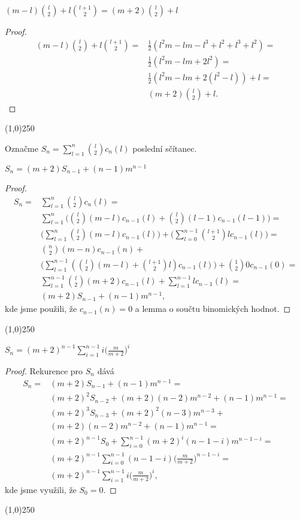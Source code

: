 \documentclass[a4paper,12pt]{article}
\newenvironment{myproof}{
  \begin{proof}
    
  }{
  \end{proof}
  \begin{center}
   \line(1,0){250}
   \end{center}
  }
\begin{document}
\begin{lemma}
    $(m-l)\binom l2+l\binom {l+1}2 = (m+2)\binom l2+l$
\end{lemma}
\begin{myproof}
    \begin{align*}(m-l)\binom l2+l\binom {l+1}2=&\frac 12(l^2m-lm-l^3+l^2+l^
    3+l^2)=\\
    &\frac 12(l^2m-lm+2l^2)=\\
    &\frac 12(l^2m-lm+2(l^2-l))+l=\\
    &(m+2)\binom l2+l.\end{align*}
\end{myproof}

Označme $S_n=\sum_{l=1}^n\binom l2c_n(l)$ poslední sčítanec.

\begin{lemma}
    $S_n = (m+2)S_{n-1}+(n-1)m^{n-1}$
\end{lemma}

\begin{myproof}
\begin{align*} S_n=&\sum_{l=1}^n\binom l2c_n(l)=\\
&\sum_{l=1}^n\big(\binom l2(m-l)c_{n-1}(l)+\binom l2(l-1)c_{n-1}(
l-1)\big)=\\
&\big(\sum_{l=1}^n\binom l2(m-l)c_{n-1}(l)\big)+\big(\sum_{l=0}^{
n-1}\binom {l+1}2lc_{n-1}(l)\big)=\\
&\binom n2(m-n)c_{n-1}(n)+\\
&\big(\sum_{l=1}^{n-1}(\binom l2(m-l)+\binom {l+1}2l)c_{n-1}(l)\big
)+\binom 120c_{n-1}(0)=\\
&\sum_{l=1}^{n-1}\binom l2(m+2)c_{n-1}(l)+\sum_{l=1}^{n-1}lc_{n-1}
(l)=\\
&(m+2)S_{n-1}+(n-1)m^{n-1},\end{align*}
kde jsme použili, že $c_{n-1}(n)=0$ a lemma o součtu binomických hodnot.
\end{myproof}

\begin{lemma}
    $S_n = (m+2)^{n-1}\sum_{i=1}^{n-1}i\big(\frac m{m+2}\big)^i$
\end{lemma}

\begin{myproof}
Rekurence pro $S_n$ dává 
\begin{align*} S_n=&(m+2)S_{n-1}+(n-1)m^{n-1}=\\
&(m+2)^2S_{n-2}+(m+2)(n-2)m^{n-2}+(n-1)m^{n-1}=\\
&(m+2)^3S_{n-3}+(m+2)^2(n-3)m^{n-3}+\\
&(m+2)(n-2)m^{n-2}+(n-1)m^{n-1}=\\
&(m+2)^{n-1}S_0+\sum_{i=0}^{n-1}(m+2)^i(n-1-i)m^{n-1-i}=\\
&(m+2)^{n-1}\sum_{i=0}^{n-1}(n-1-i)\big(\frac m{m+2}\big)^{n-1-i}
=\\
&(m+2)^{n-1}\sum_{i=1}^{n-1}i\big(\frac m{m+2}\big)^i,\end{align*}
kde jsme využili, že $S_0=0$. 
\end{myproof}
\end{document}
